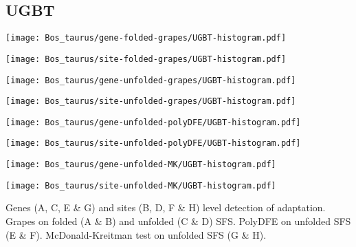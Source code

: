 \documentclass{article}
\begin{document}
\pagebreak
\subsection{UGBT}
\centering
\begin{minipage}{0.49\linewidth}
    \texttt{[image: Bos\_taurus/gene-folded-grapes/UGBT-histogram.pdf]}
\end{minipage}%
\hfill
\begin{minipage}{0.49\linewidth}
    \texttt{[image: Bos\_taurus/site-folded-grapes/UGBT-histogram.pdf]}
\end{minipage}
\hfill
\begin{minipage}{0.49\linewidth}
    \texttt{[image: Bos\_taurus/gene-unfolded-grapes/UGBT-histogram.pdf]}
\end{minipage}%
\hfill
\begin{minipage}{0.49\linewidth}
    \texttt{[image: Bos\_taurus/site-unfolded-grapes/UGBT-histogram.pdf]}
\end{minipage}
\hfill
\begin{minipage}{0.49\linewidth}
    \texttt{[image: Bos\_taurus/gene-unfolded-polyDFE/UGBT-histogram.pdf]}
\end{minipage}%
\hfill
\begin{minipage}{0.49\linewidth}
    \texttt{[image: Bos\_taurus/site-unfolded-polyDFE/UGBT-histogram.pdf]}
\end{minipage}
\hfill
\begin{minipage}{0.49\linewidth}
    \texttt{[image: Bos\_taurus/gene-unfolded-MK/UGBT-histogram.pdf]}
\end{minipage}%
\hfill
\begin{minipage}{0.49\linewidth}
    \texttt{[image: Bos\_taurus/site-unfolded-MK/UGBT-histogram.pdf]}
\end{minipage}
\hfill
\flushleft
Genes (A, C, E \& G) and sites (B, D, F \& H) level detection of adaptation.
Grapes on folded (A \& B) and unfolded (C \& D) SFS.
PolyDFE on unfolded SFS (E \& F).
McDonald-Kreitman test on unfolded SFS (G \& H).
\end{document}
